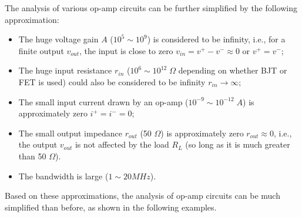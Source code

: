 The analysis of various op-amp circuits can be further simplified by the following 
approximation:
\begin{itemize}
\item The huge voltage gain $A$ ($10^5 \sim 10^9$) is considered to be infinity, 
  i.e., for a finite output $v_{out}$, the input is close to zero 
  $v_{in}=v^+ - v^-\approx 0$ or $v^+=v^-$; 
\item The huge input resistance $r_{in}$ ($10^6\sim 10^{12} \;\Omega$ depending
  on whether BJT or FET is used) could also be considered to be infinity 
  $r_{in}\rightarrow \infty$;
\item The small input current drawn by an op-amp ($10^{-9}\sim10^{-12}\;A$) 
  is approximately zero $i^+=i^-=0$;
\item The small output impedance $r_{out}$ (50 $\Omega$) is approximately zero 
  $r_{out}\approx 0$, i.e., the output $v_{out}$ is not affected by the load 
  $R_L$ (so long as it is much greater than 50 $\Omega$).
\item The bandwidth is large ($1 \sim 20MHz$).
\end{itemize}


Based on these approximations, the analysis of op-amp circuits can be much
simplified than before, as shown in the following examples.

